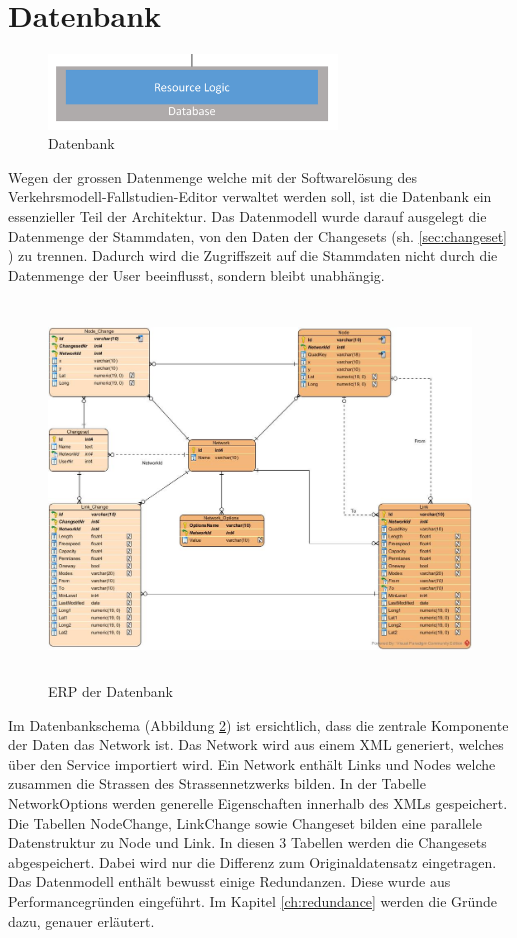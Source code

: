 \section{Datenbank}
\begin{figure}[H]
\centering
\includegraphics[height=2cm]{images/Database.png}
\caption{Datenbank}
\label{fig:database}
\end{figure}
\noindent
Wegen der grossen Datenmenge welche mit der Softwarelösung des Verkehrsmodell-Fallstudien-Editor verwaltet werden soll, ist die Datenbank ein essenzieller Teil der Architektur. Das Datenmodell wurde darauf ausgelegt die Datenmenge der Stammdaten, von den Daten der Changesets (sh. \ref{sec:changeset} ) zu trennen. Dadurch wird die Zugriffszeit auf die Stammdaten nicht durch die Datenmenge der User beeinflusst, sondern bleibt unabhängig.
\begin{figure}[H]
\centering
\includegraphics[height=10cm]{images/SimmapDatabase.jpg}
\caption{ERP der Datenbank}
\label{fig:databasescheme}
\end{figure}
\noindent
Im Datenbankschema (Abbildung \ref{fig:databasescheme}) ist ersichtlich, dass die zentrale Komponente der Daten das Network ist. Das Network wird aus einem XML generiert, welches über den Service importiert wird. Ein Network enthält Links und Nodes welche zusammen die Strassen des Strassennetzwerks bilden. In der Tabelle Network\textunderscore Options werden generelle Eigenschaften innerhalb des XMLs gespeichert.\\
Die Tabellen Node\textunderscore Change, Link\textunderscore Change sowie Changeset bilden eine parallele Datenstruktur zu Node und Link. In diesen 3 Tabellen werden die Changesets abgespeichert. Dabei wird nur die Differenz zum Originaldatensatz eingetragen.\\
Das Datenmodell enthält bewusst einige Redundanzen. Diese wurde aus Performancegründen eingeführt. Im Kapitel \ref{ch:redundance}  werden die Gründe dazu, genauer erläutert.

